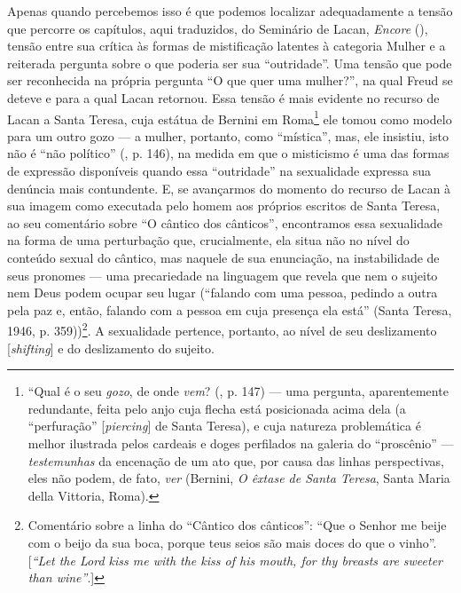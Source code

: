 Apenas quando percebemos isso é que podemos localizar adequadamente a
tensão que percorre os capítulos, aqui traduzidos, do Seminário  de
Lacan, \emph{Encore} (), tensão entre sua crítica às formas de
mistificação latentes à categoria Mulher e a reiterada pergunta sobre o
que poderia ser sua ``outridade''. Uma tensão que pode ser reconhecida
na própria pergunta ``O que quer uma mulher?'', na qual Freud se deteve
e para a qual Lacan retornou. Essa tensão é mais evidente no recurso de
Lacan a Santa Teresa, cuja estátua de Bernini em Roma\footnote{``Qual é
  o seu \emph{gozo}, de onde \emph{vem}? (, p. 147) --- uma
  pergunta, aparentemente redundante, feita pelo anjo cuja flecha está
  posicionada acima dela (a ``perfuração'' {[}\emph{piercing}{]} de
  Santa Teresa), e cuja natureza problemática é melhor ilustrada pelos
  cardeais e doges perfilados na galeria do ``proscênio'' ---
  \emph{testemunhas} da encenação de um ato que, por causa das linhas
  perspectivas, eles não podem, de fato, \emph{ver} (Bernini, \emph{O
  êxtase de Santa Teresa}, Santa Maria della Vittoria, Roma).} ele tomou
como modelo para um outro gozo --- a mulher, portanto, como ``mística'',
mas, ele insistiu, isto não é ``não político'' (, p. 146), na
medida em que o misticismo é uma das formas de expressão disponíveis
quando essa ``outridade'' na sexualidade expressa sua denúncia mais
contundente. E, se avançarmos do momento do recurso de Lacan à sua
imagem como executada pelo homem aos próprios escritos de Santa Teresa,
ao seu comentário sobre ``O cântico dos cânticos'', encontramos essa
sexualidade na forma de uma perturbação que, crucialmente, ela situa não
no nível do conteúdo sexual do cântico, mas naquele de sua enunciação,
na instabilidade de seus pronomes --- uma precariedade na linguagem que
revela que nem o sujeito nem Deus podem ocupar seu lugar (``falando com
uma pessoa, pedindo a outra pela paz e, então, falando com a pessoa em
cuja presença ela está'' (Santa Teresa, 1946, p. 359))\footnote{Comentário
  sobre a linha do ``Cântico dos cânticos'': ``Que o Senhor me beije com
  o beijo da sua boca, porque teus seios são mais doces do que o
  vinho''. {[}\emph{``Let the Lord kiss me with the kiss of his mouth,
  for thy breasts are sweeter than wine''}.{]}}. A sexualidade pertence,
portanto, ao nível de seu deslizamento {[}\emph{shifting}{]} e do
deslizamento do sujeito.

